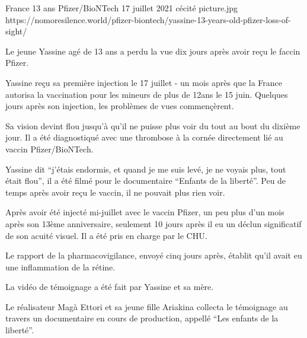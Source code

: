 {France}
{13 ans}
{Pfizer/BioNTech}
{17 juillet 2021}
{cécité}
{picture.jpg}
{https://nomoresilence.world/pfizer-biontech/yassine-13-years-old-pfizer-loss-of-sight/}
{

Le jeune Yassine agé de 13 ans a perdu la vue dix jours après avoir reçu le faccin Pfizer.

Yassine reçu sa première injection le 17 juillet - un mois après que la France autorisa la vaccination pour les mineurs de plus de 12ans le 15 juin. Quelques jours après son injection, les problèmes de vues commençèrent.

Sa vision devint flou jusqu'à qu'il ne puisse plus voir du tout au bout du dixième jour. Il a été diagnostiqué avec une thrombose à la cornée directement lié au vaccin Pfizer/BioNTech.

Yassine dit “j'étais endormis, et quand je me suis levé, je ne voyais plus, tout était flou”, il a été filmé pour le documentaire “Enfants de la liberté”. Peu de temps après avoir reçu le vaccin, il ne pouvait plus rien voir.

Après avoir été injecté mi-juillet avec le vaccin Pfizer, un peu plus d'un mois après son 13ème anniversaire, seulement 10 jours après il eu un déclun significatif de son acuité visuel. Il a été pris en charge par le CHU.

Le rapport de la pharmacovigilance, envoyé cinq jours après, établit qu'il avait eu une inflammation de la rétine.

La vidéo de témoignage a été fait par Yassine et sa mère.

Le réalisateur Magà Ettori et sa jeune fille Ariakina collecta le témoignage au travers un documentaire en cours de production, appellé “Les enfants de la liberté”.

}
